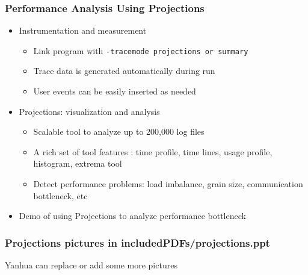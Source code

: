\begin{frame}
  \frametitle{Performance Analysis Using Projections}
  \begin{itemize}
  \item Instrumentation and measurement
  \begin{itemize}
  \item Link program with {\tt -tracemode projections or summary}
  \item Trace data is generated automatically during run
  \item User events can be easily inserted as needed
  \end{itemize}
  \item Projections: visualization and analysis
  \begin{itemize}
  \item Scalable tool to analyze up to 200,000 log files
  \item A rich set of tool features : time profile, time lines, usage profile, histogram, extrema tool
  \item Detect performance problems: load imbalance, grain size, communication bottleneck, etc 
  \end{itemize}
  \item Demo of using Projections to analyze performance bottleneck
  \end{itemize}

\end{frame}

\begin{frame}

\frametitle{Projections pictures in includedPDFs/projections.ppt}

 Yanhua can replace or add some more pictures

\end{frame}
